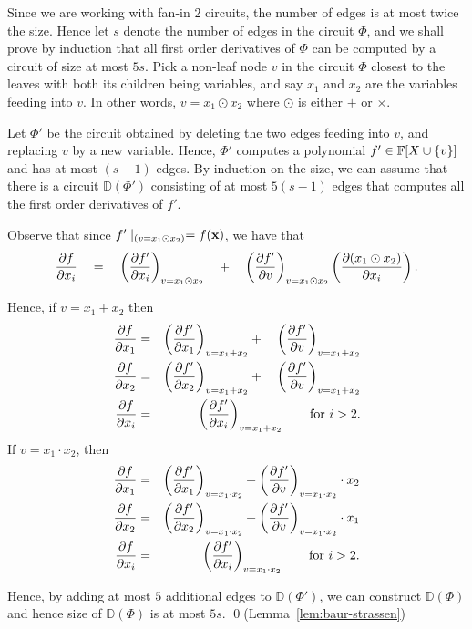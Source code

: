 \documentclass[12pt]{report}
\begin{document}
Since we are working with fan-in $2$ circuits, the number of edges is at most twice the size. Hence let $s$ denote the number of edges in the circuit $\Phi$, and we shall prove by induction that all first order derivatives of $\Phi$ can be computed by a circuit of size at most $5s$. Pick a non-leaf node $v$ in the circuit $\Phi$ closest to the leaves with both its children being variables, and say $x_1$ and $x_2$ are the variables feeding into $v$. In other words, $v = x_1 \odot x_2$ where $\odot$ is either $+$ or $\times$.

Let $\Phi'$ be the circuit obtained by deleting the two edges feeding into $v$, and replacing $v$ by a new variable. Hence, $\Phi'$ computes a polynomial $f' \in \mathbb{F}[X\cup \left\{v\right\}]$ and has at most $(s-1)$ edges. By induction on the size, we can assume that there is a circuit $\mathbb{D}(\Phi')$ consisting of at most $5(s-1)$ edges that computes all the first order derivatives of $f'$.

Observe that since $f'\mid_{(v = x_1 \odot x_2)} = f(\mathbf{x})$,  we have that 
$$
\frac{\partial f}{\partial x_i} \quad = \quad\left(\frac{\partial f'}{\partial x_i}\right)_{v = x_1 \odot x_2} \quad+\quad  \left(\frac{\partial f'}{\partial v}\right)_{v = x_1 \odot x_2}\left(\frac{\partial (x_1 \odot x_2)}{\partial x_i}\right).
$$

Hence, if $v = x_1 + x_2$ then
\begin{eqnarray*}
  \frac{\partial f}{\partial x_1} & = & \left(\frac{\partial f'}{\partial x_1}\right)_{v=x_1 + x_2} +\quad \left(\frac{\partial f'}{\partial v}\right)_{v = x_1 + x_2}\\
  \frac{\partial f}{\partial x_2} & = & \left(\frac{\partial f'}{\partial x_2}\right)_{v=x_1 + x_2} +\quad \left(\frac{\partial f'}{\partial v}\right)_{v = x_1 + x_2}\\
  \frac{\partial f}{\partial x_i} & = & \left(\frac{\partial f'}{\partial x_i}\right)_{v=x_1 + x_2} \qquad\text{for $i>2$}.
\end{eqnarray*}
If $v = x_1 \cdot x_2$, then
\begin{eqnarray*}
  \frac{\partial f}{\partial x_1} & = & \left(\frac{\partial f'}{\partial x_1}\right)_{v=x_1 \cdot x_2} + \left(\frac{\partial f'}{\partial v}\right)_{v = x_1 \cdot x_2} \cdot x_2\\
  \frac{\partial f}{\partial x_2} & = & \left(\frac{\partial f'}{\partial x_2}\right)_{v=x_1 \cdot x_2} + \left(\frac{\partial f'}{\partial v}\right)_{v = x_1\cdot x_2}\cdot x_1\\
  \frac{\partial f}{\partial x_i} & = & \left(\frac{\partial f'}{\partial x_i}\right)_{v=x_1 \cdot x_2} \qquad\text{for $i>2$}.
\end{eqnarray*}

Hence, by adding at most $5$ additional edges to $\mathbb{D}(\Phi')$, we can construct $\mathbb{D}(\Phi)$ and hence size of $\mathbb{D}(\Phi)$ is at most $5s$. \qed (Lemma~\ref{lem:baur-strassen})
\end{document}

